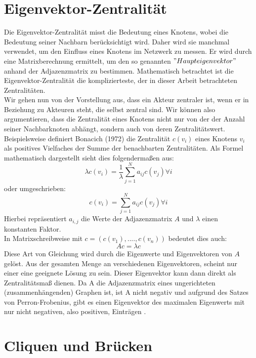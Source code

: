 \section{Eigenvektor-Zentralität}
Die Eigenvektor-Zentralität misst die Bedeutung eines Knotens, wobei die Bedeutung seiner Nachbarn berücksichtigt wird. Daher wird sie manchmal verwendet, um den Einfluss eines Knotens im Netzwerk zu messen. Er wird durch eine Matrixberechnung ermittelt, um den so genannten $"Haupteigenvektor"$ anhand der Adjazenzmatrix zu bestimmen. Mathematisch betrachtet ist die Eigenvektor-Zentralität die komplizierteste, der in dieser Arbeit betrachteten Zentralitäten.\\
Wir gehen nun von der Vorstellung aus, dass ein Akteur zentraler ist, wenn er in Beziehung zu Akteuren steht, die selbst zentral sind. Wir können also argumentieren, dass die Zentralität eines Knotens nicht nur von der der Anzahl seiner Nachbarknoten abhängt, sondern auch von deren Zentralitätswert. Beispielsweise definiert Bonacich (1972) die Zentralität $c(v_i)$ eines Knotens $v_i$ als positives Vielfaches der Summe der benachbarten Zentralitäten. Als Formel mathematisch dargestellt sieht dies folgendermaßen aus:
\begin{equation}
     \lambda c(v_i) = \frac{1}{\lambda} \sum_{j=1}^{N}a_{ij}c(v_j) \forall i
\end{equation} oder umgeschrieben:  
\begin{equation}
     c(v_i) = \sum_{j=1}^{N}a_{ij}c(v_j) \forall i
\end{equation}
Hierbei repräsentiert $a_{i,j}$ die Werte der Adjazenzmatrix $A$ und $\lambda$ einen konstanten Faktor. \\
In Matrixschreibweise mit $c = (c(v_1), ...., c(v_n))$ bedeutet dies auch:
\begin{equation}
     Ac = \lambda c
\end{equation}
Diese Art von Gleichung wird durch die Eigenwerte und Eigenvektoren von $A$ gelöst.
Aus der gesamten Menge an verschiedenen Eigenvektoren, scheint nur einer eine geeignete Lösung zu sein. 
Dieser Eigenvektor kann dann direkt als Zentralitätsmaß dienen. Da A die Adjazenzmatrix eines ungerichteten (zusammenhängenden) Graphen ist, ist A nicht negativ und aufgrund des Satzes von Perron-Frobenius, gibt es einen Eigenvektor des maximalen Eigenwerts mit nur nicht negativen, also positiven, Einträgen \cite{brittaRuhnau}.

\section{Cliquen und Brücken}


